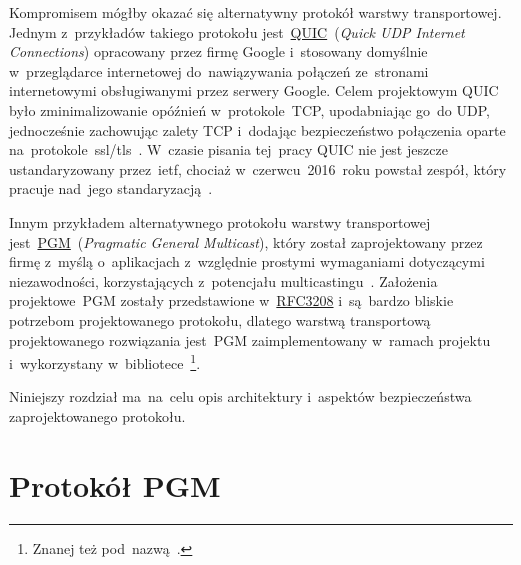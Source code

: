 \documentclass[thesis]{subfiles}
\begin{document}
Kompromisem mógłby okazać się alternatywny protokół warstwy transportowej. Jednym z~przykładów takiego protokołu jest~\href{https://en.wikipedia.org/wiki/QUIC}{QUIC}~(\emph{Quick UDP Internet Connections}) opracowany przez firmę Google i~stosowany domyślnie w~przeglądarce internetowej  do~nawiązywania połączeń ze~stronami internetowymi obsługiwanymi przez serwery Google. Celem projektowym QUIC było zminimalizowanie opóźnień w~protokole~TCP, upodabniając go~do UDP, jednocześnie zachowując zalety TCP i~dodając bezpieczeństwo połączenia oparte na~protokole~\gls{ssl/tls}~\cite{quic-wire-layout-spec,quic-crypto,quic-roskind}. W~czasie pisania tej~pracy QUIC nie jest jeszcze ustandaryzowany przez~\gls{ietf}, chociaż w~czerwcu~2016~roku powstał zespół, który pracuje nad~jego standaryzacją~\cite{quic-draft,quic-workinggroup}.

Innym przykładem alternatywnego protokołu warstwy transportowej jest~\href{https://en.wikipedia.org/wiki/Pragmatic_General_Multicast}{PGM}~(\emph{Pragmatic General Multicast}), który został zaprojektowany przez firmę  z~myślą o~aplikacjach z~względnie prostymi wymaganiami dotyczącymi niezawodności, korzystających z~potencjału multicastingu~\cite{pgm-rfc}. Założenia projektowe~PGM zostały przedstawione w~\href{https://tools.ietf.org/html/rfc3208}{RFC3208} i~są~bardzo bliskie potrzebom projektowanego protokołu, dlatego warstwą transportową projektowanego rozwiązania jest~PGM zaimplementowany w~ramach projektu  i~wykorzystany w~bibliotece~\footnote{Znanej też pod~nazwą~.}. %

Niniejszy rozdział ma~na~celu opis architektury i~aspektów bezpieczeństwa zaprojektowanego protokołu.



\section{Protokół PGM}
\end{document}
